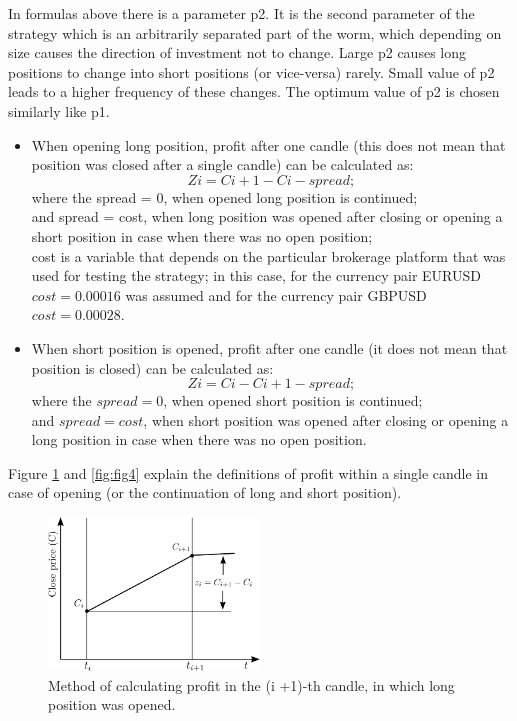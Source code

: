 \documentclass[runningheads,a4paper]{llncs}
\begin{document}
In formulas above there is a parameter p2. It is the second parameter of the strategy which is an arbitrarily separated part of the worm, which depending on size causes the direction of investment not to change. Large p2 causes long positions to change into short positions (or vice-versa) rarely. Small value of p2 leads to a higher frequency of these changes. The optimum value of p2 is chosen similarly like p1.
\begin{itemize}
\item 	When opening long position, profit after one candle (this does not mean that position was closed after a single candle) can be calculated as:
\begin{equation}
Zi = Ci +1 - Ci - spread;
\end{equation}
where the spread = 0, when opened long position is continued; \\
and spread = cost, when long position was opened after closing or opening a short position in case when there was no open position;\\
cost is a variable that depends on the particular brokerage platform that was used for testing the strategy; in this case, for the currency pair EURUSD $cost = 0.00016$ was assumed and for the currency pair GBPUSD $cost = 0.00028$.
\item When short position is opened, profit after one candle (it does not mean that position is closed) can be calculated as: 
\begin{equation}
Zi = Ci-Ci +1- spread;
\end{equation}
where the $spread = 0$, when opened short position is continued;\\ 
and $spread = cost$, when short position was opened after closing or opening a long position in case when there was no open position.
\end{itemize}
Figure \ref{fig:fig3} and \ref{fig:fig4} explain the definitions of profit within a single candle in case of opening (or the continuation of long and short position).
\begin{figure}[h!]
\centering
\includegraphics[width = 0.5\textwidth]{figures/rys3.png}
\caption{Method of calculating profit in the (i +1)-th candle, in which long position was opened.}
\label{fig:fig3}
\end{figure}
\end{document}
